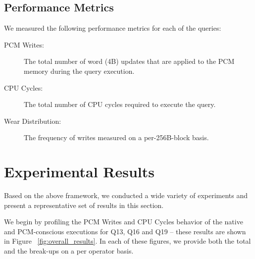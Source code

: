 \begin{figure*}[t]
{
}

\caption{ Query execution plan trees}

\label{fig:plan_trees}

\end{figure*}




\subsection{Performance Metrics}
We measured the following performance metrics for each of the queries:
\begin{description}


\item [PCM Writes:] The total number of word (4B) updates that are applied to the PCM memory during
the query execution.
\item [CPU Cycles:] The total number of CPU cycles required to execute the query.
\item [Wear Distribution:] The frequency of writes measured on a per-256B-block basis.

\end{description}

\section{Experimental Results}
\label{sec:results}
Based on the above framework, we conducted a wide variety of experiments
and present a representative set of results in this section.

We begin by profiling the PCM Writes and CPU Cycles behavior of
the native and PCM-conscious executions for Q13, Q16 and Q19 --
these results are shown in Figure ~\ref{fig:overall_results}.  In each of these figures, we provide both the total and
the break-ups on a per operator basis.

\begin{figure*}[t]

\centering

\hspace{0mm}
\hspace{0mm}
\caption{Overall performance of queries}
\label{fig:overall_results}
\end{figure*}


